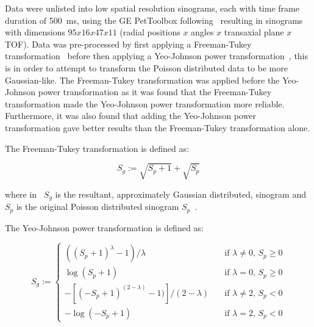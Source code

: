                 Data were unlisted into low spatial resolution sinograms, each with time frame duration of \SI{500}{\milli\second}, using the \gls{GE} PetToolbox following~ resulting in sinograms with dimensions $95 x 16 x 47 x 11$ (radial positions $x$ angles $x$ transaxial plane $x$ \gls{TOF}). Data was pre-processed by first applying a Freeman-Tukey transformation~ before then applying a Yeo-Johnson power transformation~, this is in order to attempt to transform the Poisson distributed data to be more Gaussian-like. The Freeman-Tukey transformation was applied before the Yeo-Johnson power transformation as it was found that the Freeman-Tukey transformation made the Yeo-Johnson power transformation more reliable. Furthermore, it was also found that adding the Yeo-Johnson power transformation gave better results than the Freeman-Tukey transformation alone.
                
                The Freeman-Tukey transformation is defined as:

                \begin{equation} \label{eq:pca_data_driven_surrogate_signal_extraction_methods_for_dynamic_pet_methods_freeman_tukey}
                    S_g := \sqrt{S_p + 1} + \sqrt{S_p}
                \end{equation}

                \noindent where in~ $S_g$ is the resultant, approximately Gaussian distributed, sinogram and $S_p$ is the original Poisson distributed sinogram $S_p$~.
                
                The Yeo-Johnson power transformation is defined as:

                \begin{equation} \label{eq:pca_data_driven_surrogate_signal_extraction_methods_for_dynamic_pet_methods_yeo_johnson}
                    S_g := \begin{cases}
                                ((S_p + 1)^\lambda - 1) / \lambda                   & \quad \text{if } \lambda \neq 0 \text{, } S_p \geq 0 \\
                                \log(S_p + 1)                                       & \quad \text{if } \lambda = 0 \text{, } S_p \geq 0    \\
                                -[(-S_p + 1)^{(2 - \lambda)} - 1)] / (2 - \lambda)  & \quad \text{if } \lambda \neq 2 \text{, } S_p < 0    \\
                                -\log(-S_p + 1)                                     & \quad \text{if } \lambda = 2 \text{, } S_p < 0
                            \end{cases}
                \end{equation}

